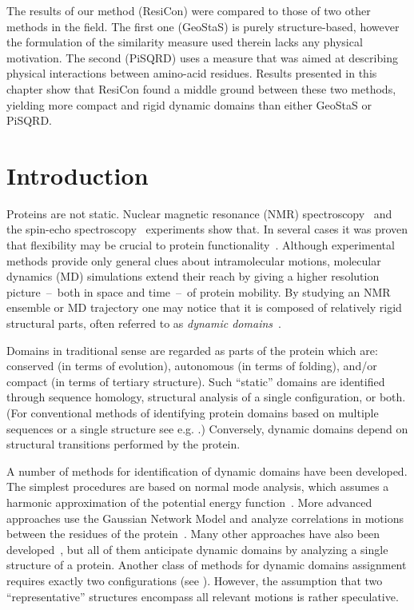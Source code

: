 \documentclass[a4paper,11pt,twoside]{book}%
\begin{document}
The results of our method (ResiCon) were compared to those of two other methods in the field.
The first one (GeoStaS) is purely structure-based, however the formulation of the similarity measure used therein lacks any physical motivation.
The second (PiSQRD) uses a measure that was aimed at describing physical interactions between amino-acid residues.
Results presented in this chapter show that ResiCon found a middle ground between these two methods, yielding more compact and rigid dynamic domains than either GeoStaS or PiSQRD.

\section{Introduction}
Proteins are not static.
Nuclear magnetic resonance (NMR) spectroscopy~\cite{martin1988two} and the spin-echo spectroscopy~\cite{bu2011proteins} experiments show that.
In several cases it was proven that flexibility may be crucial to protein functionality~\cite{farago2010activation,hamelberg2005fast}.
Although experimental methods provide only general clues about intramolecular motions, molecular dynamics (MD) simulations extend their reach by giving a higher resolution picture~--~both in space and time~--~of protein mobility.
By studying an NMR ensemble or MD trajectory one may notice that it is composed of relatively rigid structural parts, often referred to as \emph{dynamic domains}~\cite{hayward1997model}.

Domains in traditional sense are regarded as parts of the protein which are: conserved (in terms of evolution), autonomous (in terms of folding), and/or compact (in terms of tertiary structure).
Such ``static'' domains are identified through sequence homology, structural analysis of a single configuration, or both.
(For conventional methods of identifying protein domains based on multiple sequences or a single structure see e.g. \cite{richardson1981anatomy,bork1991shuffled}.)
Conversely, dynamic domains depend on structural transitions performed by the protein.

A number of methods for identification of dynamic domains have been developed.
The simplest procedures are based on normal mode analysis, which assumes a harmonic approximation of the potential energy function~\cite{hinsen1998analysis}.
More advanced approaches use the Gaussian Network Model and analyze correlations in motions between the residues of the protein~\cite{yesylevskyy2006dynamic}.
Many other approaches have also been developed~\cite{bahar1997direct,wriggers1997protein,bernhard2010optimal,genoni2012identification,potestio2009coarse}, but all of them anticipate dynamic domains by analyzing a single structure of a protein.
Another class of methods for dynamic domains assignment requires exactly two configurations (see \cite{hayward1998systematic,lee2003dyndom,ye2003flexible}).
However, the assumption that two ``representative'' structures encompass all relevant motions is rather speculative.
\end{document}
